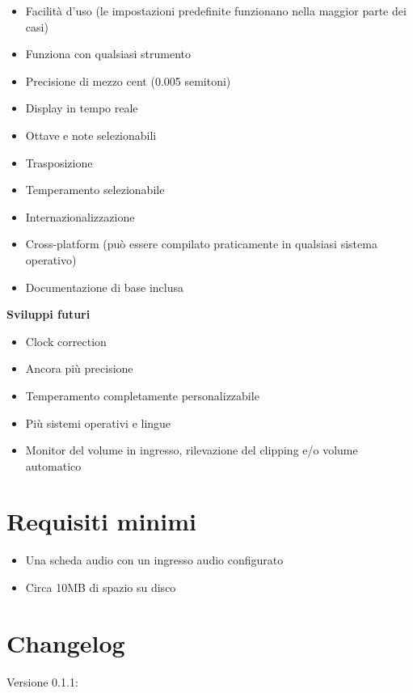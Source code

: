 \begin{itemize}
	\item Facilità d'uso (le impostazioni predefinite funzionano nella maggior parte dei casi)
	\item Funziona con qualsiasi strumento
	\item Precisione di mezzo cent (0.005 semitoni)
	\item Display in tempo reale
	\item Ottave e note selezionabili
	\item Trasposizione
	\item Temperamento selezionabile
	\item Internazionalizzazione
	\item Cross-platform (può essere compilato praticamente in qualsiasi sistema operativo)
	\item Documentazione di base inclusa
\end{itemize}

\textbf{Sviluppi futuri}
\begin{itemize}
	\item Clock correction
	\item Ancora più precisione
	\item Temperamento completamente personalizzabile
	\item Più sistemi operativi e lingue
	\item Monitor del volume in ingresso, rilevazione del clipping e/o volume automatico
\end{itemize}

\section{Requisiti minimi}\label{requirements}

\begin{itemize}
\item Una scheda audio con un ingresso audio configurato
\item Circa 10MB di spazio su disco
\end{itemize}

\section{Changelog}\label{changelog}

Versione 0.1.1:

